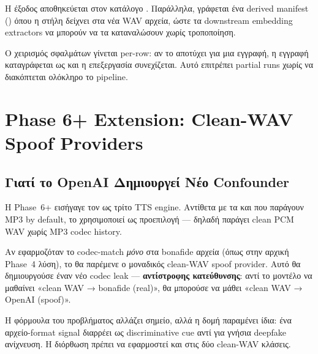 Η έξοδος αποθηκεύεται στον κατάλογο
.
Παράλληλα, γράφεται ένα derived manifest
()
όπου η στήλη  δείχνει στα νέα WAV αρχεία,
ώστε τα downstream embedding extractors να μπορούν να τα καταναλώσουν
χωρίς τροποποίηση.

Ο χειρισμός σφαλμάτων γίνεται per-row:
αν το  αποτύχει για μια εγγραφή,
η εγγραφή καταγράφεται ως  και η επεξεργασία συνεχίζεται.
Αυτό επιτρέπει partial runs χωρίς να διακόπτεται ολόκληρο το pipeline.

\section{Phase 6+ Extension: Clean-WAV Spoof Providers}
\label{sec:clean-wav-extension}

\subsection{Γιατί το OpenAI Δημιουργεί Νέο Confounder}
\label{subsec:openai-confounder}

Η Phase~6+ εισήγαγε τον  ως τρίτο TTS engine.
Αντίθετα με τα  και 
που παράγουν MP3 by default,
το  χρησιμοποιεί
 ως προεπιλογή —
δηλαδή παράγει clean PCM WAV χωρίς MP3 codec history.

Αν εφαρμοζόταν το codec-match \emph{μόνο} στα bonafide αρχεία
(όπως στην αρχική Phase~4 λύση),
το  θα παρέμενε ο μοναδικός clean-WAV spoof provider.
Αυτό θα δημιουργούσε έναν νέο codec leak —
\textbf{αντίστροφης κατεύθυνσης}:
αντί το μοντέλο να μαθαίνει «clean WAV → bonafide (real)»,
θα μπορούσε να μάθει «clean WAV → OpenAI (spoof)».

Η φόρμουλα του προβλήματος αλλάζει σημείο,
αλλά η δομή παραμένει ίδια:
ένα αρχείο-format signal διαρρέει ως discriminative cue
αντί για γνήσια deepfake ανίχνευση.
Η διόρθωση πρέπει να εφαρμοστεί και στις δύο clean-WAV κλάσεις.

\subsection{}
\label{subsec:clean-wav-providers}

